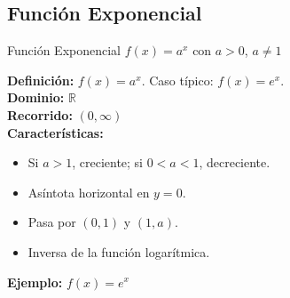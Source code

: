 \documentclass[12pt,a4paper]{article}
\begin{document}
\subsection{Función Exponencial}
\begin{funcbox}{Función Exponencial $f(x)=a^x$ con $a>0$, $a\neq 1$}
\begin{minipage}[t]{0.55\textwidth}
    \textbf{Definición:} $f(x)=a^x$. Caso típico: $f(x)=e^x$.\\
    \textbf{Dominio:} $\mathbb{R}$\\
    \textbf{Recorrido:} $(0,\infty)$\\
    \textbf{Características:}
    \begin{itemize}
        \item Si $a>1$, creciente; si $0<a<1$, decreciente.
        \item Asíntota horizontal en $y=0$.
        \item Pasa por $(0,1)$ y $(1,a)$.
        \item Inversa de la función logarítmica.
    \end{itemize}
    \textbf{Ejemplo:} $f(x)=e^x$
\end{minipage}\hfill
\begin{minipage}[t]{0.4\textwidth}
    \centering
\end{minipage}
\end{funcbox}

\end{document}
